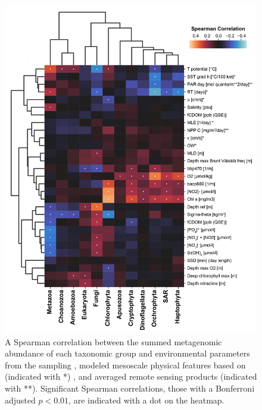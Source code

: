 \documentclass[12pt]{article}
\numberwithin{equation}{section}
\begin{document}
\begin{figure}
    \centering
    \includegraphics[width=0.9\columnwidth]{si-figures/mag-group-correlation-01.png}
    \caption{ A Spearman correlation between the summed metagenomic abundance of each taxonomic group and environmental parameters from the sampling \citep{taraoceansconsortium2016ecoa}, modeled mesoscale physical features based on \citet{d_Ovidio_2010} (indicated with *) , and averaged remote sensing products (indicated with **). Significant Spearman correlations, those with a Bonferroni adjusted $p<0.01$, are indicated with a dot on the heatmap.}
    \label{fig:env-corr}
\end{figure}
\end{document}
